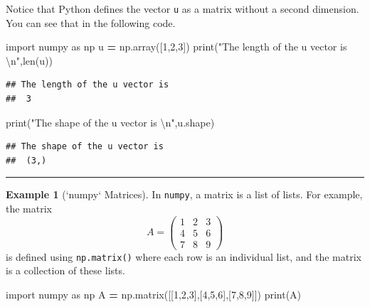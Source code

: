 \documentclass[
]{book}
\newenvironment{Shaded}{\begin{snugshade}}{\end{snugshade}}
\newcommand{\BuiltInTok}[1]{#1}
\newcommand{\CharTok}[1]{\textcolor[rgb]{0.31,0.60,0.02}{#1}}
\newcommand{\DecValTok}[1]{\textcolor[rgb]{0.00,0.00,0.81}{#1}}
\newcommand{\ImportTok}[1]{#1}
\newcommand{\NormalTok}[1]{#1}
\newcommand{\OperatorTok}[1]{\textcolor[rgb]{0.81,0.36,0.00}{\textbf{#1}}}
\newcommand{\StringTok}[1]{\textcolor[rgb]{0.31,0.60,0.02}{#1}}
\theoremstyle{definition}
\theoremstyle{definition}
\newtheorem{example}{Example}[chapter]
\theoremstyle{definition}
\theoremstyle{remark}
\begin{document}
Notice that Python defines the vector \texttt{u} as a matrix without a second dimension. You can see that in the following code.

\begin{Shaded}
\begin{Highlighting}[]
\ImportTok{import}\NormalTok{ numpy }\ImportTok{as}\NormalTok{ np}
\NormalTok{u }\OperatorTok{=}\NormalTok{ np.array([}\DecValTok{1}\NormalTok{,}\DecValTok{2}\NormalTok{,}\DecValTok{3}\NormalTok{])}
\BuiltInTok{print}\NormalTok{(}\StringTok{"The length of the u vector is }\CharTok{\textbackslash{}n}\StringTok{"}\NormalTok{,}\BuiltInTok{len}\NormalTok{(u))}
\end{Highlighting}
\end{Shaded}

\begin{verbatim}
## The length of the u vector is 
##  3
\end{verbatim}

\begin{Shaded}
\begin{Highlighting}[]
\BuiltInTok{print}\NormalTok{(}\StringTok{"The shape of the u vector is }\CharTok{\textbackslash{}n}\StringTok{"}\NormalTok{,u.shape)}
\end{Highlighting}
\end{Shaded}

\begin{verbatim}
## The shape of the u vector is 
##  (3,)
\end{verbatim}

\begin{center}\rule{0.5\linewidth}{0.5pt}\end{center}

\begin{example}[`numpy` Matrices]
\protect\hypertarget{exm:unnamed-chunk-276}{}{\label{exm:unnamed-chunk-276} {} }In \texttt{numpy}, a matrix is a list of lists. For example, the matrix
\[ A = \begin{pmatrix} 1 & 2 & 3 \\ 4 & 5 & 6 \\ 7 & 8 & 9 \end{pmatrix} \]
is defined using \texttt{np.matrix()} where each row is an individual list, and the matrix is a collection of these lists.
\end{example}

\begin{Shaded}
\begin{Highlighting}[]
\ImportTok{import}\NormalTok{ numpy }\ImportTok{as}\NormalTok{ np}
\NormalTok{A }\OperatorTok{=}\NormalTok{ np.matrix([[}\DecValTok{1}\NormalTok{,}\DecValTok{2}\NormalTok{,}\DecValTok{3}\NormalTok{],[}\DecValTok{4}\NormalTok{,}\DecValTok{5}\NormalTok{,}\DecValTok{6}\NormalTok{],[}\DecValTok{7}\NormalTok{,}\DecValTok{8}\NormalTok{,}\DecValTok{9}\NormalTok{]])}
\BuiltInTok{print}\NormalTok{(A)}
\end{Highlighting}
\end{Shaded}
\end{document}
